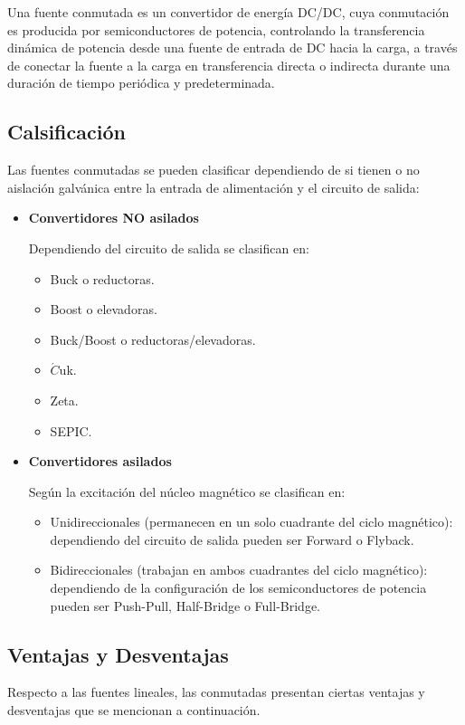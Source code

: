 \documentclass[11pt, a4paper]{article}
\begin{document}
Una fuente conmutada es un convertidor de energía DC/DC, cuya conmutación es producida por semiconductores de potencia, controlando la transferencia dinámica de potencia desde una fuente de entrada de DC hacia la carga, a través de conectar la fuente a la carga en transferencia directa o indirecta durante una duración de tiempo periódica y predeterminada.

\subsection{Calsificación}
Las fuentes conmutadas se pueden clasificar dependiendo de si tienen o no aislación galvánica entre la entrada de alimentación y el circuito de salida:
\begin{itemize} 
	\item \textbf{Convertidores NO asilados}
	
	Dependiendo del circuito de salida se clasifican en:
		\begin{itemize}
			\item Buck o reductoras.
			\item Boost o elevadoras.
			\item Buck/Boost o reductoras/elevadoras.
			\item $\acute{C}$uk.
			\item Zeta.
			\item SEPIC.
		\end{itemize}
	\item \textbf{Convertidores asilados}
	
	Según la excitación del núcleo magnético se clasifican en:
		\begin{itemize}
			\item Unidireccionales (permanecen en un solo cuadrante del ciclo magnético): dependiendo del circuito de salida pueden ser Forward o Flyback.
			\item Bidireccionales (trabajan en ambos cuadrantes del ciclo magnético): dependiendo de la configuración de los semiconductores de potencia pueden ser Push-Pull, Half-Bridge o Full-Bridge.
		\end{itemize}
\end{itemize}

\subsection{Ventajas y Desventajas}
Respecto a las fuentes lineales, las conmutadas presentan ciertas ventajas y desventajas que se mencionan a continuación.
\end{document}
